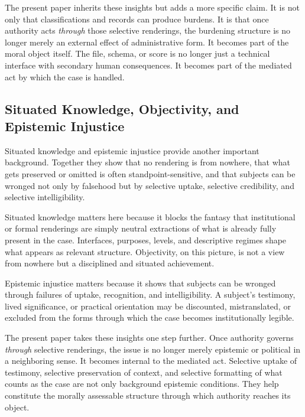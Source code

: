\documentclass[11pt]{article}
\renewcommand{\emph}[1]{\textit{#1}}
\begin{document}
The present paper inherits these insights but adds a more specific claim. It is not only that classifications and records can produce burdens. It is that once authority acts \emph{through} those selective renderings, the burdening structure is no longer merely an external effect of administrative form. It becomes part of the moral object itself. The file, schema, or score is no longer just a technical interface with secondary human consequences. It becomes part of the mediated act by which the case is handled.

\subsection{Situated Knowledge, Objectivity, and Epistemic Injustice}

Situated knowledge and epistemic injustice provide another important background. Together they show that no rendering is from nowhere, that what gets preserved or omitted is often standpoint-sensitive, and that subjects can be wronged not only by falsehood but by selective uptake, selective credibility, and selective intelligibility. \cite{Douglas2004IrreducibleComplexityObjectivity,Haraway1988SituatedKnowledges,Fricker2007EpistemicInjustice}

Situated knowledge matters here because it blocks the fantasy that institutional or formal renderings are simply neutral extractions of what is already fully present in the case. Interfaces, purposes, levels, and descriptive regimes shape what appears as relevant structure. Objectivity, on this picture, is not a view from nowhere but a disciplined and situated achievement. \cite{Douglas2004IrreducibleComplexityObjectivity,Haraway1988SituatedKnowledges}

Epistemic injustice matters because it shows that subjects can be wronged through failures of uptake, recognition, and intelligibility. A subject's testimony, lived significance, or practical orientation may be discounted, mistranslated, or excluded from the forms through which the case becomes institutionally legible. \cite{Fricker2007EpistemicInjustice}

The present paper takes these insights one step further. Once authority governs \emph{through} selective renderings, the issue is no longer merely epistemic or political in a neighboring sense. It becomes internal to the mediated act. Selective uptake of testimony, selective preservation of context, and selective formatting of what counts as the case are not only background epistemic conditions. They help constitute the morally assessable structure through which authority reaches its object.
\end{document}
